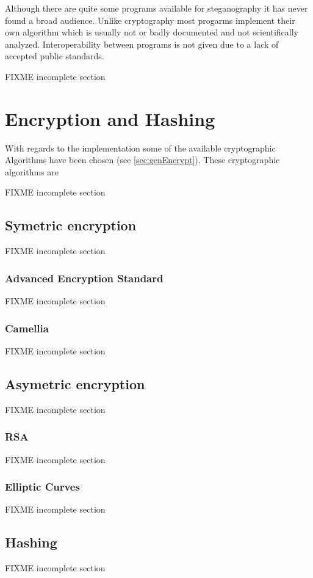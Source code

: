 Although there are quite some programs available for steganography it has never found a broad audience. Unlike cryptography most progarms implement their own algorithm which is usually not or badly documented and not scientifically analyzed. Interoperability between programs is not given due to a lack of accepted public standards. 

FIXME incomplete section

\section{Encryption and Hashing}
With regards to the implementation some of the available cryptographic Algorithms have been chosen  (see \ref{sec:genEncrypt}). These cryptographic algorithms are 

FIXME incomplete section

\subsection{Symetric encryption}
FIXME incomplete section

\subsubsection{Advanced Encryption Standard}
FIXME incomplete section

\subsubsection{Camellia}
FIXME incomplete section

\subsection{Asymetric encryption}
FIXME incomplete section

\subsubsection{RSA}
FIXME incomplete section

\subsubsection{Elliptic Curves}
FIXME incomplete section

\subsection{Hashing}
FIXME incomplete section

